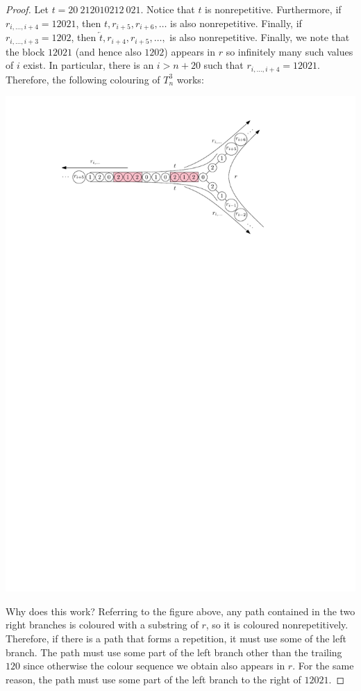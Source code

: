 \documentclass{patmorin}
\begin{document}
\begin{proof}
Let $t=20\:212010212\:021$.  Notice that $t$ is nonrepetitive.
Furthermore, if $r_{i,\ldots,i+4}=12021$, then $t,r_{i+5},r_{i+6},\ldots$
is also nonrepetitive.  Finally, if $r_{i,\ldots,i+3}=1202$, then
$\overleftarrow{t},r_{i+4},r_{i+5},\ldots,$ is also nonrepetitive.
Finally, we note that the block $12021$ (and hence also $1202$) appears
in $r$ so infinitely many such values of $i$ exist.  In particular,
there is an $i > n+20$ such that $r_{i,\ldots,i+4}=12021$. Therefore,
the following colouring of $T^3_n$ works:
\begin{center}
  \includegraphics{t3n}
\end{center}
Why does this work?  Referring to the figure above, any path contained
in the two right branches is coloured with a substring of $r$, so it is
coloured nonrepetitively.  Therefore, if there is a path that forms a
repetition, it must use some of the left branch.  The path must use some
part of the left branch other than the trailing $120$ since otherwise the
colour sequence we obtain also appears in $r$.  For the same reason, the
path must use some part of the left branch to the right of $12021$.


\end{proof}
\end{document}
